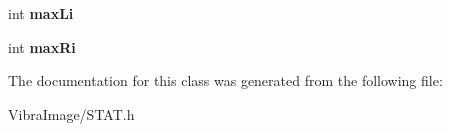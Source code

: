 \begin{DoxyCompactItemize}
\item 
\hypertarget{class_a_u_r_a___s_t_a_t___l_i_n_e_a14c3362ef902d8c9184b745b5482a011}{int {\bfseries max\+Li}}\label{class_a_u_r_a___s_t_a_t___l_i_n_e_a14c3362ef902d8c9184b745b5482a011}

\item 
\hypertarget{class_a_u_r_a___s_t_a_t___l_i_n_e_a9673a7697c72d2eab0c78f959e5acc5f}{int {\bfseries max\+Ri}}\label{class_a_u_r_a___s_t_a_t___l_i_n_e_a9673a7697c72d2eab0c78f959e5acc5f}

\end{DoxyCompactItemize}


The documentation for this class was generated from the following file\+:\begin{DoxyCompactItemize}
\item 
Vibra\+Image/S\+T\+A\+T.\+h\end{DoxyCompactItemize}
